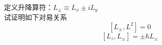 \begin{frame} [allowframebreaks=]
    \frametitle{}
    \begin{tcolorbox}[colback=yellow!5,colframe=yellow!75!black,title=课堂作业]
        定义升降算符：$L_\pm \equiv L_x \pm i L_y$ \\
     试证明如下对易关系  $$[L_\pm,L^2]=0$$
     $$[L_z, L_\pm]= \pm \hbar L_\pm $$
    \end{tcolorbox}
\end{frame} 
